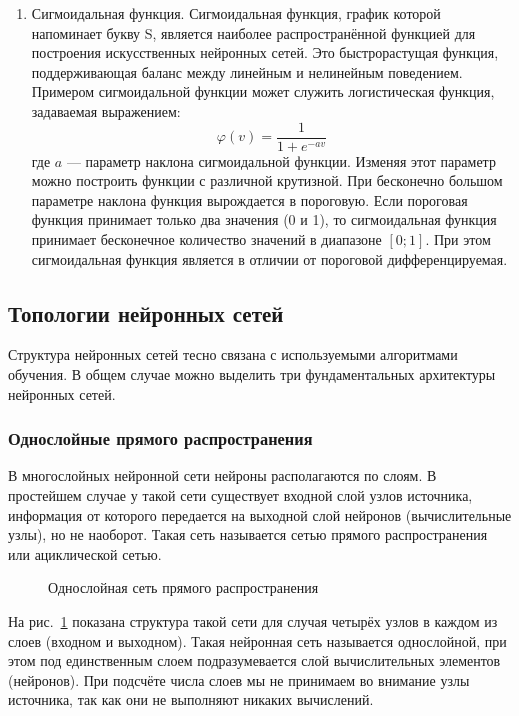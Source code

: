 \begin{enumerate}
\begin{itemize}
\end{itemize}
\item Сигмоидальная функция. 
Сигмоидальная функция, график которой напоминает букву S, является наиболее распространённой функцией для построения искусственных нейронных сетей.
Это быстрорастущая функция, поддерживающая баланс между линейным и нелинейным поведением.
Примером сигмоидальной функции может служить логистическая функция, задаваемая выражением:
\begin{equation}
\varphi(v) = \frac1{1+e^{-av}}
\end{equation}
где $a$ --- параметр наклона сигмоидальной функции.
Изменяя этот параметр можно построить функции с различной крутизной.
При бесконечно большом параметре наклона функция вырождается в пороговую.
Если пороговая функция принимает только два значения (0 и 1), то сигмоидальная функция принимает бесконечное количество значений в диапазоне $[0;1]$.
При этом сигмоидальная функция является в отличии от пороговой дифференцируемая.\cite{NejronnyeSeti}
\end{enumerate}
\subsection{Топологии нейронных сетей}

Структура нейронных сетей тесно связана с используемыми алгоритмами обучения.
В общем случае можно выделить три фундаментальных архитектуры нейронных сетей.

\subsubsection{Однослойные прямого распространения}

В многослойных нейронной сети нейроны располагаются по слоям.
В простейшем случае у такой сети существует входной слой узлов источника, информация от которого передается на выходной слой нейронов (вычислительные узлы), но не наоборот. 
Такая сеть называется сетью прямого распространения или ациклической сетью.
\begin{figure}[ht]
\caption{Однослойная сеть прямого распространения}
\label{ris:OneLayer}
\end{figure}

На рис.~\ref{ris:OneLayer} показана структура такой сети для случая четырёх узлов в каждом из слоев (входном и выходном).
Такая нейронная сеть называется однослойной, при этом под единственным слоем подразумевается слой вычислительных элементов (нейронов).
При подсчёте числа слоев мы не принимаем во внимание узлы источника, так как они не выполняют никаких вычислений.\cite{NejronnyeSeti}

